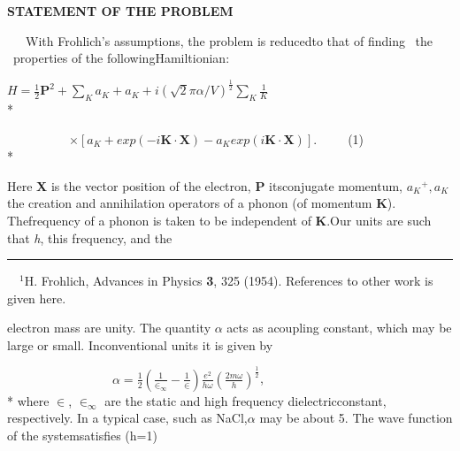 \documentclass[8pt,a4paper]{extarticle}
\begin{document}
\begin{multicols}{2}
\begin{flushleft}
	\end{flushleft}
	\bigskip
	\begin{center}
		\uppercase{\textbf{statement of the problem}}
	\end{center}
	
	\begin{flushleft}
		\justify
		~~~With Frohlich's assumptions, the problem is reduced\linebreak to that of finding ~the ~properties of the following\linebreak Hamiltionian:\linebreak

		$H=\frac{1}{2}{\textbf{P}}^2+\sum_{K}a_K+a_K+i{(\sqrt{2}\pi\alpha/V)}^{\frac{1}{2}}\sum_{K}\displaystyle \frac{1}{K}$\\*

		~~~~~~~~~~$\times[a_{K}+exp(-i\textbf{K}\cdot \textbf{X})-a_{K}exp(i\textbf{K}\cdot \textbf{X})]$.~~~~~(1)\\*

		Here \textbf{X} is the vector position of the electron, \textbf{P} its\linebreak conjugate momentum, ${a_K}^{+}, a_K$ the creation and annihilation operators of a phonon (of momentum \textbf{K}). The\linebreak frequency of a phonon is taken to be independent of \textbf{K}.\linebreak Our units are such that \textit{h}, this frequency, and the\linebreak
		\rule{1,3cm}{0.1pt}
		\justify
		\small{~~${}^1$H. Frohlich, Advances in Physics \textbf{3}, 325 (1954). References to other work is given here.}
	\end{flushleft}
	\columnbreak

	\begin{flushright}
		\justify
		electron mass are unity. The quantity $\alpha$ acts as a\linebreak coupling constant, which may be large or small. In\linebreak conventional units it is given by

			~~~~~~~~~~~~~~~~~$\alpha=\frac{1}{2}(\frac{1}{{\in}_{\infty}}-\frac{1}{\in})\frac{e^2}{h\omega}{(\frac{2m\omega}{h})}^{\frac{1}{2}}$,\\*
		\justify
		where $\in$, ${\in}_{\infty}$ are the static and high frequency dielectric\linebreak constant, respectively. In a typical case, such as NaCl,\linebreak $\alpha$ may be about 5. The wave function of the system\linebreak satisfies (h=1)


\end{flushright}
\end{multicols}
\end{document}
